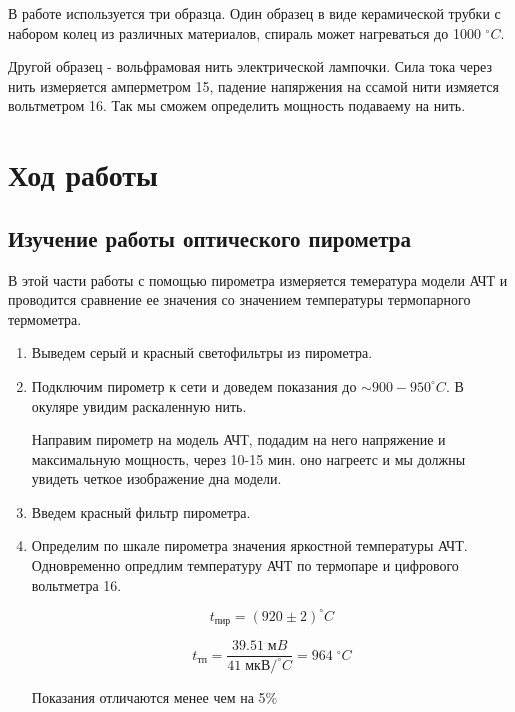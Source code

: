 \documentclass[a4paper]{article}
\begin{document}
В работе используется три образца. Один образец в виде керамической трубки с набором колец 
из различных материалов, спираль может нагреваться до 1000 $^{\circ} C$. \par 

Другой образец - вольфрамовая нить электрической лампочки. Сила тока через нить измеряется амперметром 15, падение 
напяржения на ссамой нити измяется вольтметром 16. Так мы сможем определить мощность подаваему на нить. 



\section{Ход работы}



\subsection{Изучение работы оптического пирометра}



В этой части работы с помощью пирометра измеряется темература модели АЧТ и проводится сравнение
ее значения со значением температуры термопарного термометра. 

\begin{enumerate}
    \item Выведем серый и красный светофильтры из пирометра.
    
    \item Подключим пирометр к сети и доведем показания до $\sim 900 - 950 ^{\circ} C$. В окуляре
    увидим раскаленную нить. \par
    Направим пирометр на модель АЧТ, подадим на него напряжение и максимальную мощность, через 10-15 мин. 
    оно нагреетс и мы должны увидеть четкое изображение дна модели. 

    \item Введем красный фильтр пирометра.

    \item Определим по шкале пирометра значения яркостной температуры АЧТ.  Одновременно опредлим 
    температуру АЧТ по термопаре  и цифрового вольтметра 16.

    $$t_{\text{пир}}= (920\pm2) ^{\circ} C$$

    $$t_{\text{тп}} = \frac{39.51\; мB}{41 \; \text{мкВ/}^{\circ} C} = 964 \; ^{\circ} C$$

    Показания отличаются менее чем на 5\%
\end{enumerate}
\end{document}
